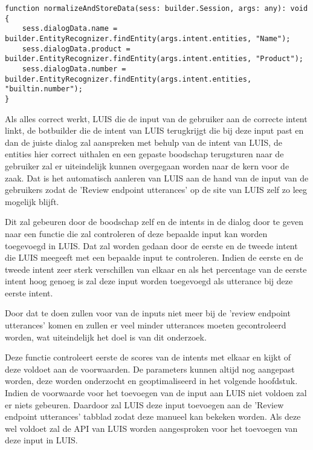 \medskip
\begin{lstlisting}[caption=Analyseren van de intent]
function normalizeAndStoreData(sess: builder.Session, args: any): void {
	sess.dialogData.name = builder.EntityRecognizer.findEntity(args.intent.entities, "Name");
	sess.dialogData.product = builder.EntityRecognizer.findEntity(args.intent.entities, "Product");
	sess.dialogData.number = builder.EntityRecognizer.findEntity(args.intent.entities, "builtin.number");
}
\end{lstlisting}

Als alles correct werkt, LUIS die de input van de gebruiker aan de correcte intent linkt, de botbuilder die de intent van LUIS terugkrijgt die bij deze input past en dan de juiste dialog zal aanspreken met behulp van de intent van LUIS, de entities hier correct uithalen en een gepaste boodschap terugsturen naar de gebruiker zal er uiteindelijk kunnen overgegaan worden naar de kern voor de zaak. Dat is het automatisch aanleren van LUIS aan de hand van de input van de gebruikers zodat de 'Review endpoint utterances' op de site van LUIS zelf zo leeg mogelijk blijft.

Dit zal gebeuren door de boodschap zelf en de intents in de dialog door te geven naar een functie die zal controleren of deze bepaalde input kan worden toegevoegd in LUIS. Dat zal worden gedaan door de eerste en de tweede intent die LUIS meegeeft met een bepaalde input te controleren. Indien de eerste en de tweede intent zeer sterk verschillen van elkaar en als het percentage van de eerste intent hoog genoeg is zal deze input worden toegevoegd als utterance bij deze eerste intent.

Door dat te doen zullen voor van de inputs niet meer bij de 'review endpoint utterances' komen en zullen er veel minder utterances moeten gecontroleerd worden, wat uiteindelijk het doel is van dit onderzoek.

Deze functie controleert eerste de scores van de intents met elkaar en kijkt of deze voldoet aan de voorwaarden. De parameters kunnen altijd nog aangepast worden, deze worden onderzocht en geoptimaliseerd in het volgende hoofdstuk. Indien de voorwaarde voor het toevoegen van de input aan LUIS niet voldoen zal er niets gebeuren. Daardoor zal LUIS deze input toevoegen aan de 'Review endpoint utterances' tabblad zodat deze manueel kan bekeken worden. Als deze wel voldoet zal de API van LUIS worden aangesproken voor het toevoegen van deze input in LUIS.


